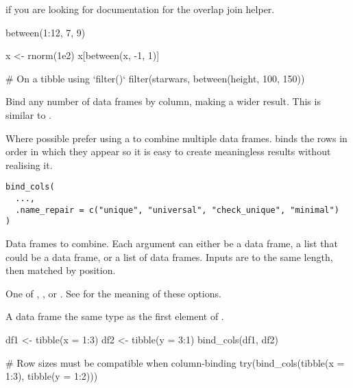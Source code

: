 \documentclass[a4paper]{book}
\begin{document}
%
\begin{SeeAlso}
 if you are looking for documentation for the  overlap
join helper.
\end{SeeAlso}
%
\begin{Examples}
\begin{ExampleCode}
between(1:12, 7, 9)

x <- rnorm(1e2)
x[between(x, -1, 1)]

# On a tibble using `filter()`
filter(starwars, between(height, 100, 150))
\end{ExampleCode}
\end{Examples}
%
\begin{Description}
Bind any number of data frames by column, making a wider result.
This is similar to .

Where possible prefer using a  to combine multiple
data frames.  binds the rows in order in which they appear
so it is easy to create meaningless results without realising it.
\end{Description}
%
\begin{Usage}
\begin{verbatim}
bind_cols(
  ...,
  .name_repair = c("unique", "universal", "check_unique", "minimal")
)
\end{verbatim}
\end{Usage}
%
\begin{Arguments}
\begin{ldescription}
\item[\code{...}] Data frames to combine. Each argument can either be a data frame,
a list that could be a data frame, or a list of data frames.
Inputs are  to the same length,
then matched by position.

\item[\code{.name\_repair}] One of , , or
. See  for the meaning of these
options.
\end{ldescription}
\end{Arguments}
%
\begin{Value}
A data frame the same type as the first element of .
\end{Value}
%
\begin{Examples}
\begin{ExampleCode}
df1 <- tibble(x = 1:3)
df2 <- tibble(y = 3:1)
bind_cols(df1, df2)

# Row sizes must be compatible when column-binding
try(bind_cols(tibble(x = 1:3), tibble(y = 1:2)))
\end{ExampleCode}
\end{Examples}
\end{document}
